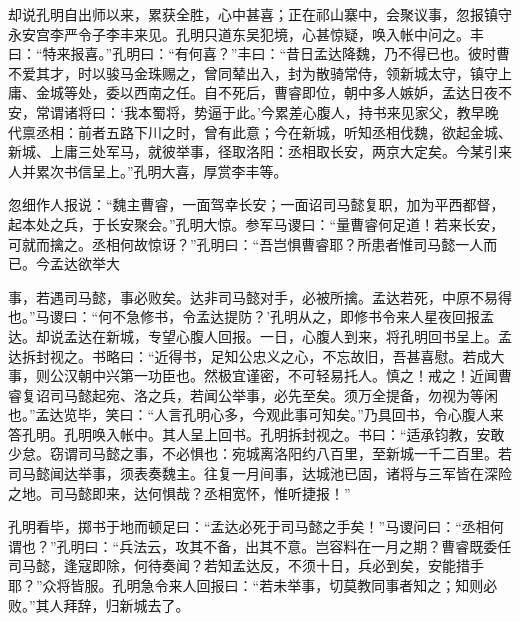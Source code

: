 却说孔明自出师以来，累获全胜，心中甚喜；正在祁山寨中，会聚议事，忽报镇守永安宫李严令子李丰来见。孔明只道东吴犯境，心甚惊疑，唤入帐中问之。丰曰：“特来报喜。”孔明曰：“有何喜？”丰曰：“昔日孟达降魏，乃不得已也。彼时曹不爱其才，时以骏马金珠赐之，曾同辇出入，封为散骑常侍，领新城太守，镇守上庸、金城等处，委以西南之任。自不死后，曹睿即位，朝中多人嫉妒，孟达日夜不安，常谓诸将曰：‘我本蜀将，势逼于此。’今累差心腹人，持书来见家父，教早晚代禀丞相：前者五路下川之时，曾有此意；今在新城，听知丞相伐魏，欲起金城、新城、上庸三处军马，就彼举事，径取洛阳：丞相取长安，两京大定矣。今某引来人并累次书信呈上。”孔明大喜，厚赏李丰等。

忽细作人报说：“魏主曹睿，一面驾幸长安；一面诏司马懿复职，加为平西都督，起本处之兵，于长安聚会。”孔明大惊。参军马谡曰：“量曹睿何足道！若来长安，可就而擒之。丞相何故惊讶？”孔明曰：“吾岂惧曹睿耶？所患者惟司马懿一人而已。今孟达欲举大

事，若遇司马懿，事必败矣。达非司马懿对手，必被所擒。孟达若死，中原不易得也。”马谡曰：“何不急修书，令孟达提防？’孔明从之，即修书令来人星夜回报孟达。却说孟达在新城，专望心腹人回报。一日，心腹人到来，将孔明回书呈上。孟达拆封视之。书略曰：“近得书，足知公忠义之心，不忘故旧，吾甚喜慰。若成大事，则公汉朝中兴第一功臣也。然极宜谨密，不可轻易托人。慎之！戒之！近闻曹睿复诏司马懿起宛、洛之兵，若闻公举事，必先至矣。须万全提备，勿视为等闲也。”孟达览毕，笑曰：“人言孔明心多，今观此事可知矣。”乃具回书，令心腹人来答孔明。孔明唤入帐中。其人呈上回书。孔明拆封视之。书曰：“适承钧教，安敢少怠。窃谓司马懿之事，不必惧也：宛城离洛阳约八百里，至新城一千二百里。若司马懿闻达举事，须表奏魏主。往复一月间事，达城池已固，诸将与三军皆在深险之地。司马懿即来，达何惧哉？丞相宽怀，惟听捷报！”

孔明看毕，掷书于地而顿足曰：“孟达必死于司马懿之手矣！”马谡问曰：“丞相何谓也？”孔明曰：“兵法云，攻其不备，出其不意。岂容料在一月之期？曹睿既委任司马懿，逢寇即除，何待奏闻？若知孟达反，不须十日，兵必到矣，安能措手耶？”众将皆服。孔明急令来人回报曰：“若未举事，切莫教同事者知之；知则必败。”其人拜辞，归新城去了。

